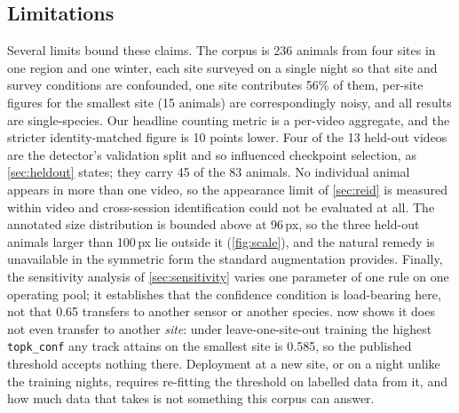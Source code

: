 \subsection{Limitations}
\label{sec:limitations}

Several limits bound these claims. The corpus is 236 animals from four sites in one region and one winter, each site surveyed
on a single night so that site and survey conditions are confounded, one site contributes 56\% of them, per-site figures for the smallest site
(15 animals) are correspondingly noisy, and all results are single-species. Our headline
counting metric is a per-video aggregate, and the stricter identity-matched figure is 10
points lower. Four of the 13 held-out videos are the detector's validation split and so
influenced checkpoint selection, as \cref{sec:heldout} states; they carry 45 of the 83
animals. No individual animal appears in more than one video, so the appearance limit of \cref{sec:reid} is measured within video and cross-session identification could not be
evaluated at all. The annotated size distribution is bounded above at 96\,px, so the three
held-out animals larger than 100\,px lie outside it (\cref{fig:scale}), and the natural
remedy is unavailable in the symmetric form the standard augmentation provides. Finally, the
sensitivity analysis of \cref{sec:sensitivity} varies one parameter of one rule on one
operating pool; it establishes that the confidence condition is load-bearing here, not that
0.65 transfers to another sensor or another species.  now shows it does not
even transfer to another \emph{site}: under leave-one-site-out training the highest
\texttt{topk\_conf} any track attains on the smallest site is 0.585, so the published
threshold accepts nothing there. Deployment at a new site, or on a night unlike the training nights, requires re-fitting the threshold on labelled data from it, and how much data that takes is not something this corpus can answer.
